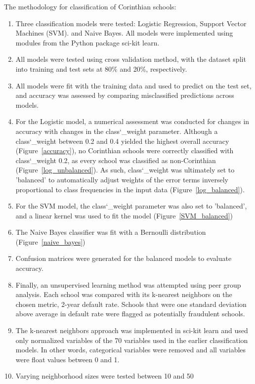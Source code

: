 \documentclass[10pt,twocolumn]{article}
\begin{document}
The methodology for classification of Corinthian schools:
\begin{enumerate}
\item Three classification models were tested: Logistic Regression, Support Vector Machines (SVM).
and Naive Bayes. All models were implemented using
modules from the Python package sci-kit learn.
\item All models were tested using cross validation method, with the dataset
split into training and test sets at 80\% and 20\%, respectively.
\item All models were fit with the training data and used to predict on the test set,
and accuracy was assessed by comparing misclassified predictions across models.
\item For the Logistic model, a numerical assessment was conducted for changes in accuracy
with changes in the class\char`_weight parameter. Although a class\char`_weight between 0.2 and 0.4 yielded the highest
overall accuracy (Figure~\ref{accuracy}), no Corinthian schools were correctly classified with class\char`_weight 0.2, as every school
was classified as non-Corinthian (Figure~\ref{log_unbalanced}). As such, class\char`_weight
was ultimately set to 'balanced' to automatically adjust
weights of the error terms inversely proportional to class frequencies in the input data (Figure~\ref{log_balanced}).
\item For the SVM model, the class\char`_weight parameter was also set to 'balanced', and a
linear kernel was used to fit the model (Figure~\ref{SVM_balanced})
\item The Naive Bayes classifier was fit with a Bernoulli distribution (Figure~\ref{naive_bayes})
\item Confusion matrices were generated for the balanced models to evaluate accuracy.
\item Finally, an unsupervised learning method was attempted using peer group analysis. Each
school was compared with its k-nearest neighbors on the chosen metric, 2-year default rate.
Schools that were one standard deviation above average in default rate were flagged as potentially fraudulent schools.
\item The k-nearest neighbors approach was implemented in sci-kit learn and used only normalized
variables of the 70 variables used in the earlier classification models. In other words, categorical
variables were removed and all variables were float values between 0 and 1.
\item Varying neighborhood sizes were tested between 10 and 50
\end{enumerate}
\end{document}
